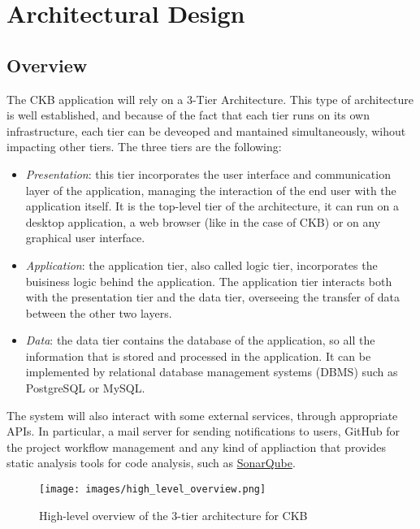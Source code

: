 \documentclass[a4paper, 11pt, titlepage]{article}
\begin{document}
\newpage


\section{Architectural Design}

\subsection{Overview}

The CKB application will rely on a 3-Tier Architecture. This type of architecture is well established, and because of the fact that each tier runs on its own infrastructure, each tier can be deveoped and mantained simultaneously, wihout impacting other tiers.
The three tiers are the following:
\begin{itemize}
  \item \textit{Presentation}: this tier incorporates the user interface and communication layer of the application, managing the interaction of the end user with the application itself.
  It is the top-level tier of the architecture, it  can run on a desktop application, a web browser (like in the case of CKB) or on any graphical user interface.
  \item \textit{Application}: the application tier, also called logic tier, incorporates the buisiness logic behind the application. The application tier interacts both with the presentation tier and the data tier, overseeing the transfer of data between the other two layers.
  \item \textit{Data}: the data tier contains the database of the application, so all the information that is stored and processed in the application. It can be implemented by relational database management systems (DBMS) such as PostgreSQL or MySQL.  
\end{itemize} 

The system will also interact with some external services, through appropriate APIs. In particular, a mail server for sending notifications to users, GitHub for the project workflow management and any kind of appliaction that provides static analysis tools for code analysis, such as \href{https://www.sonarsource.com/products/sonarqube/}{SonarQube}.

\begin{figure}[H]
  \texttt{[image: images/high\_level\_overview.png]}
  \caption{High-level overview of the 3-tier architecture for CKB}
  \label{fig:CKB_high_level_overview}
  \centering
\end{figure}
\end{document}
